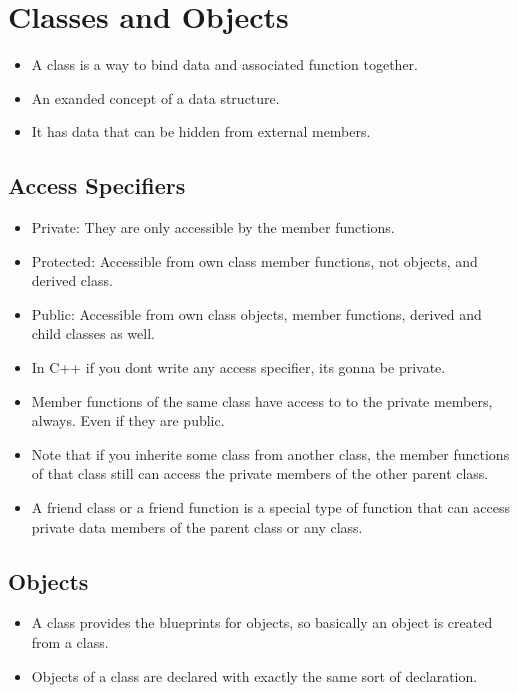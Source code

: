 \documentclass[11pt]{article}
\begin{document}
\section{Classes and Objects}

\begin{itemize}
	\item A class is a way to bind data and associated function together. 
	\item An exanded concept of a data structure.
	\item It has data that can be hidden from external members.
\end{itemize}

\subsection{Access Specifiers}
\begin{itemize}
	\item Private: They are only accessible by the member functions. 
	\item Protected: Accessible from own class member functions, not objects, and derived class.
	\item Public: Accessible from own class objects, member functions, derived and child classes as well. 
	\item In C++ if you dont write any access specifier, its gonna be private. 
	\item Member functions of the same class have access to to the private members, always. Even if they are public. 
	\item Note that if you inherite some class from another class, the member functions of that class still can access the private members of the other parent class. 
	\item A friend class or a friend function is a special type of function that can access private data members of the parent class or any class. 
\end{itemize}

\subsection{Objects}
\begin{itemize}
	\item A class provides the blueprints for objects, so basically an object is created from a class. 
	\item Objects of a class are declared with exactly the same sort of declaration. 
\end{itemize}
\end{document}
